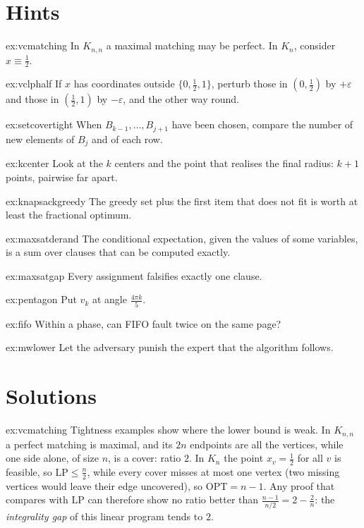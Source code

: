 \section{Hints}

\begin{hint}{ex:vcmatching}
In $K_{n,n}$ a maximal matching may be perfect. In $K_n$, consider $x\equiv\frac12$.
\end{hint}
\begin{hint}{ex:vclphalf}
If $x$ has coordinates outside $\{0,\frac12,1\}$, perturb those in $(0,\frac12)$ by $+\varepsilon$ and those in $(\frac12,1)$ by $-\varepsilon$, and the other way round.
\end{hint}
\begin{hint}{ex:setcovertight}
When $B_{k-1},\dots,B_{j+1}$ have been chosen, compare the number of new elements of $B_j$ and of each row.
\end{hint}
\begin{hint}{ex:kcenter}
Look at the $k$ centers and the point that realises the final radius: $k+1$ points, pairwise far apart.
\end{hint}
\begin{hint}{ex:knapsackgreedy}
The greedy set plus the first item that does not fit is worth at least the fractional optimum.
\end{hint}
\begin{hint}{ex:maxsatderand}
The conditional expectation, given the values of some variables, is a sum over clauses that can be computed exactly.
\end{hint}
\begin{hint}{ex:maxsatgap}
Every assignment falsifies exactly one clause.
\end{hint}
\begin{hint}{ex:pentagon}
Put $v_k$ at angle $\frac{4\pi k}5$.
\end{hint}
\begin{hint}{ex:fifo}
Within a phase, can FIFO fault twice on the same page?
\end{hint}
\begin{hint}{ex:mwlower}
Let the adversary punish the expert that the algorithm follows.
\end{hint}

\section{Solutions}

\begin{solution}{ex:vcmatching}
\idea Tightness examples show where the lower bound is weak.
\writeup In $K_{n,n}$ a perfect matching is maximal, and its $2n$ endpoints are all the vertices, while one side alone, of size $n$, is a cover: ratio $2$. In $K_n$ the point $x_v=\frac12$ for all $v$ is feasible, so $\mathrm{LP}\le\frac n2$, while every cover misses at most one vertex (two missing vertices would leave their edge uncovered), so $\mathrm{OPT}=n-1$. Any proof that compares with $\mathrm{LP}$ can therefore show no ratio better than $\frac{n-1}{n/2}=2-\frac2n$: the \emph{integrality gap} of this linear program tends to $2$.
\end{solution}

